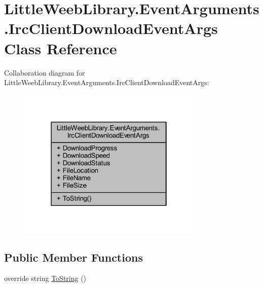 \hypertarget{class_little_weeb_library_1_1_event_arguments_1_1_irc_client_download_event_args}{}\section{Little\+Weeb\+Library.\+Event\+Arguments.\+Irc\+Client\+Download\+Event\+Args Class Reference}
\label{class_little_weeb_library_1_1_event_arguments_1_1_irc_client_download_event_args}


Collaboration diagram for Little\+Weeb\+Library.\+Event\+Arguments.\+Irc\+Client\+Download\+Event\+Args\+:\nopagebreak
\begin{figure}[H]
\begin{center}
\leavevmode
\includegraphics[width=250pt]{class_little_weeb_library_1_1_event_arguments_1_1_irc_client_download_event_args__coll__graph}
\end{center}
\end{figure}
\subsection*{Public Member Functions}
\begin{DoxyCompactItemize}
\item 
override string \mbox{\hyperlink{class_little_weeb_library_1_1_event_arguments_1_1_irc_client_download_event_args_a08055fe777a1585dafab7fbeec58b891}{To\+String}} ()
\end{DoxyCompactItemize}
